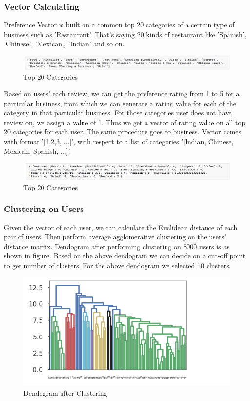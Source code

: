 \documentclass[11pt]{article}
\begin{document}
		\subsubsection{Vector Calculating}
		Preference Vector is built on a common top 20 categories of a certain type of business such as 'Restaurant'. That's saying 20 kinds of restaurant like 'Spanish', 'Chinese', 'Mexican', 'Indian' and so on.
		 \begin{figure}[h]
			\centering
			\includegraphics[scale=0.5] {vector1.png}
			\caption{Top 20 Categories}
		\end{figure}
	
		Based on users' each review, we can get the preference rating from 1 to 5 for a particular business, from which we can generate a rating value for each of the category in that particular business. For those categories user does not have review on, we assign a value of 1. Thus we get a vector of rating value on all top 20 categories for each user. The same procedure goes to business.
		Vector comes with format '[1,2,3, ...]', with respect to a list of categories '[Indian, Chinese, Mexican, Spanish, ...]'.
		 \begin{figure}[h]
			\centering
			\includegraphics[scale=0.5] {vector2.png}
			\caption{Top 20 Categories}
		\end{figure}
		
		\subsubsection{Clustering on Users}
		Given the vector of each user, we can calculate the Euclidean distance of each pair of users. Then perform average agglomerative clustering on the users' distance matrix. Dendogram after performing clustering on 8000 users is as shown in figure. Based on the above dendogram we can decide on a cut-off point to get number of clusters. For the above dendogram we selected 10 clusters. 
		 \begin{figure}[h]
			\centering
			\includegraphics[scale=0.5] {dendogram.png}
			\caption{Dendogram after Clustering}
		\end{figure}
		
\end{document}
